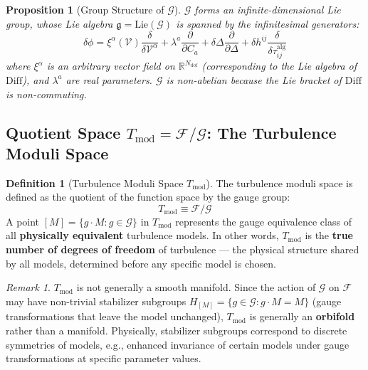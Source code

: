 \documentclass[12pt,a4paper]{article}
\theoremstyle{plain}
\newtheorem{proposition}[theorem]{Proposition}
\theoremstyle{definition}
\newtheorem{definition}[theorem]{Definition}
\theoremstyle{remark}
\newtheorem{remark}[theorem]{Remark}
\newcommand{\R}{\mathbb{R}}
\newcommand{\F}{\mathcal{F}}
\newcommand{\G}{\mathcal{G}}
\newcommand{\Tmod}{T_{\text{mod}}}
\newcommand{\pdiff}{\partial}
\newcommand{\Lie}{\mathfrak{g}}
\newcommand{\Diff}{\mathrm{Diff}}
\begin{document}
\begin{proposition}[Group Structure of $\G$]
$\G$ forms an infinite-dimensional Lie group, whose Lie algebra $\Lie = \mathrm{Lie}(\G)$ is spanned by the infinitesimal generators:
\begin{equation}
\delta\phi = \xi^\alpha(\mathcal{V})\frac{\delta}{\delta\mathcal{V}^\alpha} + \lambda^a\frac{\pdiff}{\pdiff C_a} + \delta\Delta\frac{\pdiff}{\pdiff\Delta} + \delta h^{ij}\frac{\delta}{\delta\tau_{ij}^{\text{alg}}}
\end{equation}
where $\xi^\alpha$ is an arbitrary vector field on $\R^{N_{\text{dof}}}$ (corresponding to the Lie algebra of $\Diff$), and $\lambda^a$ are real parameters. $\G$ is non-abelian because the Lie bracket of $\Diff$ is non-commuting.
\end{proposition}

\subsection{Quotient Space $\Tmod = \F/\G$: The Turbulence Moduli Space}

\begin{definition}[Turbulence Moduli Space $\Tmod$]
The turbulence moduli space is defined as the quotient of the function space by the gauge group:
\begin{equation}
\Tmod \equiv \F / \G
\end{equation}
A point $[M] = \{g\cdot M : g\in\G\}$ in $\Tmod$ represents the gauge equivalence class of all \textbf{physically equivalent} turbulence models. In other words, $\Tmod$ is the \textbf{true number of degrees of freedom} of turbulence --- the physical structure shared by all models, determined before any specific model is chosen.
\end{definition}

\begin{remark}
$\Tmod$ is not generally a smooth manifold. Since the action of $\G$ on $\F$ may have non-trivial stabilizer subgroups $H_{[M]} = \{g\in\G : g\cdot M = M\}$ (gauge transformations that leave the model unchanged), $\Tmod$ is generally an \textbf{orbifold} rather than a manifold. Physically, stabilizer subgroups correspond to discrete symmetries of models, e.g., enhanced invariance of certain models under gauge transformations at specific parameter values.
\end{remark}

\end{document}
